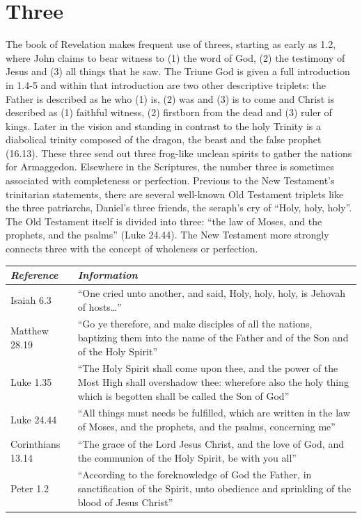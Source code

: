 \section*{Three}
The book of Revelation makes frequent use of threes, starting as early as 1.2, where John claims to bear witness to (1) the word of God, (2) the testimony of Jesus and (3) all things that he saw. The Triune God is given a full introduction in 1.4-5 and within that introduction are two other descriptive triplets: the Father is described as he who (1) is, (2) was and (3) is to come and Christ is described as (1) faithful witness, (2) firstborn from the dead and (3) ruler of kings. Later in the vision and standing in contrast to the holy Trinity is a diabolical trinity composed of the dragon, the beast and the false prophet (16.13). These three send out three frog-like unclean spirits to gather the nations for Armaggedon.
\newline\newline
Elsewhere in the Scriptures, the number three is sometimes associated with completeness or perfection. Previous to the New Testament's trinitarian statements, there are several well-known Old Testament triplets like the three patriarchs, Daniel's three friends, the seraph's cry of ``Holy, holy, holy''. The Old Testament itself is divided into three: ``the law of Moses, and the prophets, and the psalms'' (Luke 24.44). The New Testament more strongly connects three with the concept of wholeness or perfection.  
\newline\newline
\begin{tabularx}{\textwidth}{l X}
\toprule
\rowcolor{headergray}\emph{Reference} & \emph{Information}\\ 
\midrule
Isaiah 6.3 & ``One cried unto another, and said, Holy, holy, holy, is Jehovah of hosts\ldots'' \\
\addlinespace
Matthew 28.19 & ``Go ye therefore, and make disciples of all the nations, baptizing them into the name of the Father and of the Son and of the Holy Spirit'' \\
\addlinespace
Luke 1.35 &  ``The Holy Spirit shall come upon thee, and the power of the Most High shall overshadow thee: wherefore also the holy thing which is begotten shall be called the Son of God'' \\
\addlinespace
Luke 24.44 & ``All things must needs be fulfilled, which are written in the law of Moses, and the prophets, and the psalms, concerning me'' \\
\addlinespace
2 Corinthians 13.14 & ``The grace of the Lord Jesus Christ, and the love of God, and the communion of the Holy Spirit, be with you all'' \\
\addlinespace
1 Peter 1.2 & ``According to the foreknowledge of God the Father, in sanctification of the Spirit, unto obedience and sprinkling of the blood of Jesus Christ'' \\
\bottomrule
\end{tabularx}

